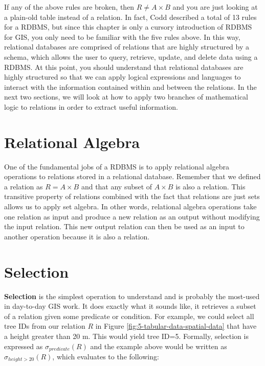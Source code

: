 \documentclass[
]{book}
\begin{document}
If any of the above rules are broken, then \(R≠A×B\) and you are just looking at a plain-old table instead of a relation. In fact, Codd described a total of 13 rules for a RDBMS, but since this chapter is only a cursory introduction of RDBMS for GIS, you only need to be familiar with the five rules above. In this way, relational databases are comprised of relations that are highly structured by a schema, which allows the user to query, retrieve, update, and delete data using a RDBMS. At this point, you should understand that relational databases are highly structured so that we can apply logical expressions and languages to interact with the information contained within and between the relations. In the next two sections, we will look at how to apply two branches of mathematical logic to relations in order to extract useful information.

\hypertarget{relational-algebra}{%
\section{Relational Algebra}\label{relational-algebra}}

One of the fundamental jobs of a RDBMS is to apply relational algebra operations to relations stored in a relational database. Remember that we defined a relation as \(R=A×B\) and that any subset of \(A×B\) is also a relation. This transitive property of relations combined with the fact that relations are just sets allows us to apply set algebra. In other words, relational algebra operations take one relation as input and produce a new relation as an output without modifying the input relation. This new output relation can then be used as an input to another operation because it is also a relation.

\hypertarget{selection}{%
\section{Selection}\label{selection}}

\textbf{Selection} is the simplest operation to understand and is probably the most-used in day-to-day GIS work. It does exactly what it sounds like, it retrieves a subset of a relation given some predicate or condition. For example, we could select all tree IDs from our relation \(R\) in Figure \ref{fig:5-tabular-data-spatial-data} that have a height greater than 20 m. This would yield tree ID=5. Formally, selection is expressed as \(σ_{predicate}(R)\) and the example above would be written as \(σ_{height>20}(R)\), which evaluates to the following:
\end{document}
